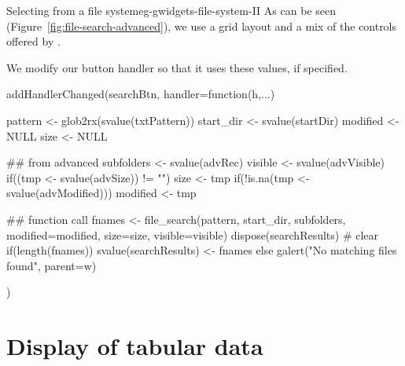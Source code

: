 \begin{example}{Selecting from a file system}{eg-gwidgets-file-system-II}
As can be seen (Figure~\ref{fig:file-search-advanced}), we use a grid
layout and a mix of the controls offered by .



We modify our button handler so that it uses these values, if
specified.


\begin{Schunk}
\begin{Sinput}
 addHandlerChanged(searchBtn, handler=function(h,...) {
   pattern <- glob2rx(svalue(txtPattern))
   start_dir <- svalue(startDir)
   modified <- NULL
   size <- NULL
 
   ## from advanced
   subfolders <- svalue(advRec)
   visible <- svalue(advVisible)
   if((tmp <- svalue(advSize)) != "") size <- tmp
   if(!is.na(tmp <- svalue(advModified))) modified <- tmp
   
   ## function call
   fnames <- file_search(pattern, start_dir, subfolders, 
                         modified=modified,
                         size=size, visible=visible)
   dispose(searchResults)                # clear
   if(length(fnames))
     svalue(searchResults) <- fnames
   else
     galert("No matching files found", parent=w)
 })
\end{Sinput}
\end{Schunk}




\end{example}


\section{Display of tabular data}
\label{sec:gWidgets-tabular-data-display}


